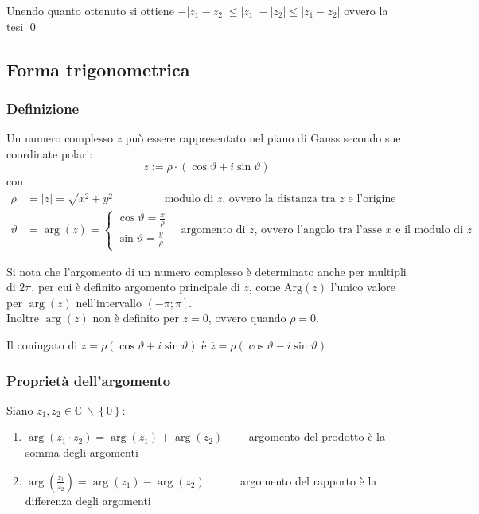 \documentclass[a4paper]{article}
\newcommand\Arg{\text{Arg}}
\begin{document}
Unendo quanto ottenuto si ottiene \(-\left|z_1 - z_2\right| \leq \left|z_1\right| - \left|z_2\right| \leq \left|z_1 - z_2\right|\) ovvero la tesi \qed

\newpage


\subsection{Forma trigonometrica}
\subsubsection*{Definizione}
Un numero complesso \(z\) può essere rappresentato nel piano di Gauss secondo sue coordinate polari:
\[z := \rho \cdot \left( \cos \vartheta + i \sin \vartheta \right)\]
con
\begin{align*}
	\rho &= \left| z \right| = \sqrt{x^2 + y^2} \qquad \qquad \;\; \text{modulo di \(z\), ovvero la distanza tra \(z\) e l'origine} \\
	\vartheta &= \arg(z) = 
	\begin{cases}
		\cos \vartheta = \frac{x}{\rho} \\
		\sin \vartheta = \frac{y}{\rho}
	\end{cases}
	\quad \text{argomento di \(z\), ovvero l'angolo tra l'asse \(x\) e il modulo di \(z\)}
\end{align*}

Si nota che l'argomento di un numero complesso è determinato anche per multipli di \(2 \pi\), per cui è definito argomento principale
di \(z\), come \(\Arg(z)\) l'unico valore per \(\arg(z)\) nell'intervallo \(\left( -\pi; \pi \right]\). \\
Inoltre \(\arg(z)\) non è definito per \(z = 0\), ovvero quando \(\rho = 0\).

Il coniugato di \(z = \rho \left( \cos \vartheta + i \sin \vartheta \right)\) è \(\overline{z} = \rho \left( \cos \vartheta - i \sin \vartheta \right)\)


\subsubsection*{Proprietà dell'argomento}
Siano \(z_1, z_2 \in \mathbb{C} \; \backslash \left\{ 0 \right\}\):
\begin{enumerate}
	\item \(\arg \left( z_1 \cdot z_2 \right) = \arg(z_1) + \arg(z_2) \qquad\) argomento del prodotto è la somma degli argomenti
	\item \(\displaystyle \arg \left( \frac{z_1}{z_2} \right) = \arg(z_1) - \arg(z_2) \qquad \;\;\;\) argomento del rapporto è la differenza degli argomenti
\end{enumerate}
\end{document}
